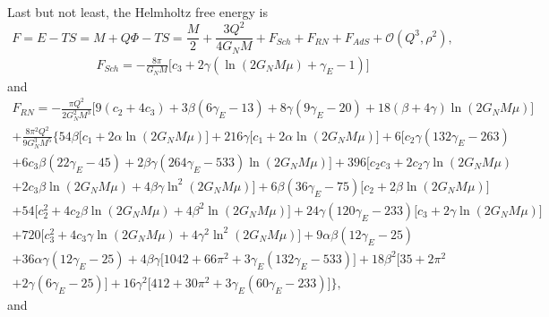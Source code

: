 \documentclass[10pt,a4paper]{article}
\begin{document}
Last but not least, the Helmholtz free energy is
\begin{equation}
    F=E-TS=M+Q\Phi-TS=\frac{M}{2}+\frac{3Q^2}{4G_NM}+F_{Sch}+F_{RN}+F_{AdS}+\mathcal{O}\left(Q^3,\rho^2\right),
\end{equation}
\begin{equation}
\begin{split}
    F_{Sch}=-\frac{8\pi}{G_NM}\Big[c_3+2\gamma\left(\ln(2G_NM\mu)+\gamma_E-1\right)\Big]
\end{split}
\end{equation}
and
\begin{multline}
F_{RN}=-\frac{\pi Q^2}{2G^2_NM^3}\Big[9(c_2+4c_3)+3\beta(6\gamma_E-13)+8\gamma(9\gamma_E-20)+18(\beta+4\gamma)\ln(2G_NM\mu)\Big]\\
+\frac{8\pi^2Q^2}{9G^3_NM^5}\bigg\{54\beta\Big[c_1+2\alpha\ln(2G_NM\mu)\big]+216\gamma\Big[c_1+2\alpha\ln(2G_NM\mu)\Big]+6\Big[c_2\gamma(132\gamma_E-263)\\
+6c_3\beta(22\gamma_E-45)+2\beta\gamma(264\gamma_E-533)\ln(2G_NM\mu)\Big]+396\Big[c_2c_3+2c_2\gamma\ln(2G_NM\mu)\\
+2c_3\beta\ln(2G_NM\mu)+4\beta\gamma\ln^2(2G_NM\mu)\Big]+6\beta(36\gamma_E-75)\Big[c_2+2\beta\ln(2G_NM\mu)\Big]\\
+54\Big[c_2^2+4c_2\beta\ln(2G_NM\mu)+4\beta^2\ln(2G_NM\mu)\Big]+24\gamma(120\gamma_E-233)\Big[c_3+2\gamma\ln(2G_NM\mu)\Big]\\
+720\Big[c^2_3+4c_3\gamma\ln(2G_NM\mu)+4\gamma^2\ln^2(2G_NM\mu)\Big]
+9\alpha\beta(12\gamma_E-25)\\
+36\alpha\gamma(12\gamma_E-25)+4\beta\gamma\Big[1042+66\pi^2+3\gamma_E(132\gamma_E-533)\Big]+18\beta^2\Big[35+2\pi^2\\+2\gamma(6\gamma_E-25)\Big]
+16\gamma^2\Big[412+30\pi^2+3\gamma_E(60\gamma_E-233)\Big]\bigg\},
\end{multline}
and
\end{document}
